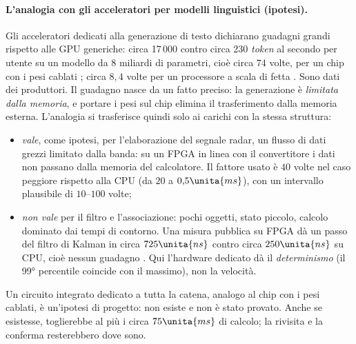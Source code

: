 \paragraph{L'analogia con gli acceleratori per modelli linguistici (ipotesi).} Gli acceleratori dedicati alla generazione di testo dichiarano guadagni grandi rispetto alle GPU generiche: circa 17\,000 contro circa 230 \emph{token} al secondo per utente su un modello da 8 miliardi di parametri, cioè circa $74$ volte, per un chip con i pesi cablati \citep{DA_VERIFICARE:heise-taalas-hc1}; circa $8{,}4$ volte per un processore a scala di fetta \citep{DA_VERIFICARE:cerebras-blog-llama}. Sono dati dei produttori. Il guadagno nasce da un fatto preciso: la generazione è \emph{limitata dalla memoria}, e portare i pesi sul chip elimina il trasferimento dalla memoria esterna. L'analogia si trasferisce quindi solo ai carichi con la stessa struttura:
\begin{itemize}
\item \emph{vale}, come ipotesi, per l'elaborazione del segnale radar, un flusso di dati grezzi limitato dalla banda: su un FPGA in linea con il convertitore i dati non passano dalla memoria del calcolatore. Il fattore usato è $40$ volte nel caso peggiore rispetto alla CPU (da $20$ a $0{,}5\unita{ms}$), con un intervallo plausibile di $10$--$100$ volte;
\item \emph{non vale} per il filtro e l'associazione: pochi oggetti, stato piccolo, calcolo dominato dai tempi di contorno. Una misura pubblica su FPGA dà un passo del filtro di Kalman in circa $725\unita{ns}$ contro circa $250\unita{ns}$ su CPU, cioè nessun guadagno \citep{DA_VERIFICARE:cern-kalman-fpga}. Qui l'hardware dedicato dà il \emph{determinismo} (il 99° percentile coincide con il massimo), non la velocità.
\end{itemize}
Un circuito integrato dedicato a tutta la catena, analogo al chip con i pesi cablati, è un'ipotesi di progetto: non esiste e non è stato provato. Anche se esistesse, toglierebbe al più i circa $75\unita{ms}$ di calcolo; la rivisita e la conferma resterebbero dove sono.

